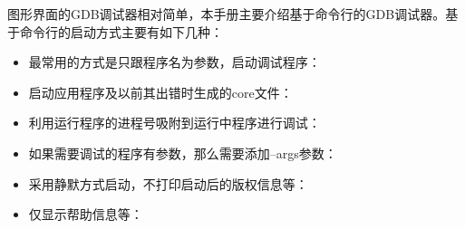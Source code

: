 \documentclass[a4paper,12pt,english]{sphinxmanual}
\begin{document}
\sphinxAtStartPar
图形界面的GDB调试器相对简单，本手册主要介绍基于命令行的GDB调试器。基于命令行的启动方式主要有如下几种：
\begin{itemize}
\item {} 
\sphinxAtStartPar
最常用的方式是只跟程序名为参数，启动调试程序：

\sphinxAtStartPar
{}

\item {} 
\sphinxAtStartPar
启动应用程序及以前其出错时生成的core文件：

\sphinxAtStartPar
{}

\item {} 
\sphinxAtStartPar
利用运行程序的进程号吸附到运行中程序进行调试：

\sphinxAtStartPar
{}

\item {} 
\sphinxAtStartPar
如果需要调试的程序有参数，那么需要添加–args参数：

\sphinxAtStartPar
{}

\item {} 
\sphinxAtStartPar
采用静默方式启动，不打印启动后的版权信息等：

\sphinxAtStartPar
{}

\item {} 
\sphinxAtStartPar
仅显示帮助信息等：

\sphinxAtStartPar
{}

\end{itemize}
\end{document}
